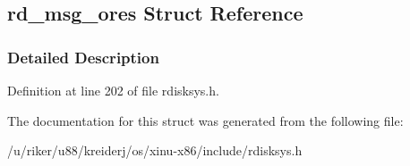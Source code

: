 \hypertarget{structrd__msg__ores}{}\subsection{rd\+\_\+msg\+\_\+ores Struct Reference}
\label{structrd__msg__ores}


\subsubsection{Detailed Description}


Definition at line 202 of file rdisksys.\+h.



The documentation for this struct was generated from the following file\+:\begin{DoxyCompactItemize}
\item 
/u/riker/u88/kreiderj/os/xinu-\/x86/include/rdisksys.\+h\end{DoxyCompactItemize}
